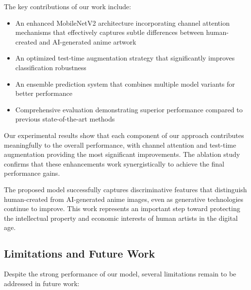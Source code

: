 \documentclass{article}
\begin{document}
The key contributions of our work include:

\begin{itemize}
    \item An enhanced MobileNetV2 architecture incorporating channel attention mechanisms that effectively captures subtle differences between human-created and AI-generated anime artwork
    
    \item An optimized test-time augmentation strategy that significantly improves classification robustness
    
    \item An ensemble prediction system that combines multiple model variants for better performance
    
    \item Comprehensive evaluation demonstrating superior performance compared to previous state-of-the-art methods
\end{itemize}

Our experimental results show that each component of our approach contributes meaningfully to the overall performance, with channel attention and test-time augmentation providing the most significant improvements. The ablation study confirms that these enhancements work synergistically to achieve the final performance gains.

The proposed model successfully captures discriminative features that distinguish human-created from AI-generated anime images, even as generative technologies continue to improve. This work represents an important step toward protecting the intellectual property and economic interests of human artists in the digital age.

\subsection{Limitations and Future Work}

Despite the strong performance of our model, several limitations remain to be addressed in future work:
\end{document}
